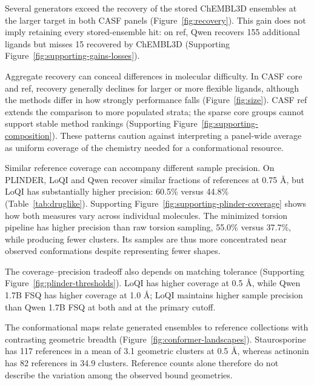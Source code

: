 

Several generators exceed the recovery of the stored ChEMBL3D ensembles at the larger
target in both CASF panels (Figure~\ref{fig:recovery}). This gain does not imply
retaining every stored-ensemble hit: on ref, Qwen recovers 155 additional ligands but
misses 15 recovered by ChEMBL3D (Supporting Figure~\ref{fig:supporting-gains-losses}).

\recoveryfigure



Aggregate recovery can conceal differences in molecular difficulty. In CASF core and ref,
recovery generally declines for larger or more flexible ligands, although the methods differ
in how strongly performance falls (Figure~\ref{fig:size}). CASF ref extends the comparison
to more populated strata; the sparse core groups cannot support stable method rankings
(Supporting Figure~\ref{fig:supporting-composition}). These patterns caution against interpreting a panel-wide average
as uniform coverage of the chemistry needed for a conformational resource.

\sizefigure

Similar reference coverage can accompany different sample precision. On PLINDER,
LoQI and Qwen recover similar fractions of references at 0.75 \AA{}, but LoQI has
substantially higher precision: 60.5\% versus 44.8\% (Table~\ref{tab:druglike}).
Supporting Figure~\ref{fig:supporting-plinder-coverage} shows how both measures vary across individual molecules.
The minimized torsion pipeline has higher precision than raw torsion sampling,
55.0\% versus 37.7\%, while producing fewer clusters. Its samples are thus more
concentrated near observed conformations despite representing fewer shapes.

The coverage--precision tradeoff also depends on matching tolerance
(Supporting Figure~\ref{fig:plinder-thresholds}). LoQI has higher
coverage at 0.5 \AA{}, while Qwen 1.7B FSQ has higher coverage at 1.0 \AA{};
LoQI maintains higher sample precision than Qwen 1.7B FSQ at both and at the primary cutoff.



The conformational maps relate generated ensembles to reference collections with
contrasting geometric breadth (Figure~\ref{fig:conformer-landscapes}). Staurosporine has
117 references in a mean of 3.1 geometric clusters at 0.5 \AA{}, whereas actinonin has
82 references in 34.9 clusters. Reference counts alone therefore do not describe the
variation among the observed bound geometries.

